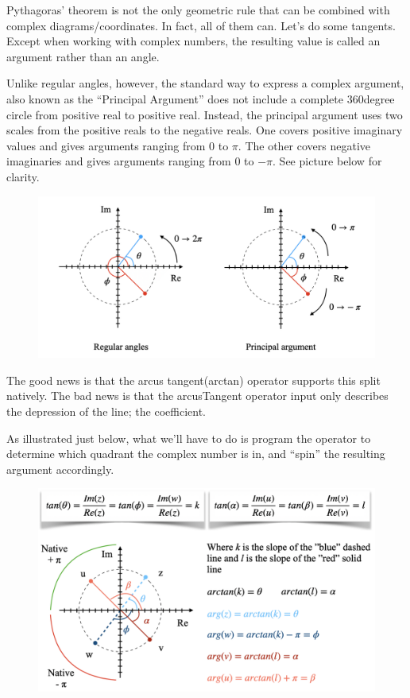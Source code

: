 Pythagoras' theorem is not the only geometric rule that can be combined with complex diagrams/coordinates. In fact, all of them can. Let's do some tangents. Except when working with complex numbers, the resulting value is called an argument rather than an angle.

Unlike regular angles, however, the standard way to express a complex argument, also known as the ``Principal Argument'' does not include a complete 360degree circle from positive real to positive real. Instead, the principal argument uses two scales from the positive reals to the negative reals. One covers positive imaginary values and gives arguments ranging from 0 to $\pi$. The other covers negative imaginaries and gives arguments ranging from 0 to $-\pi$. See picture below for clarity.

\begin{figure}[h!]
    \centering
    \includegraphics[scale= 0.45]{arg.png}
    \caption{}
    \label{arg}
\end{figure}

The good news is that the arcus tangent(arctan) operator supports this split natively. The bad news is that the arcusTangent operator input only describes the depression of the line; the coefficient.

As illustrated just below, what we'll have to do is program the operator to determine which quadrant the complex number is in, and ``spin'' the resulting argument accordingly.

\begin{figure}[h!]
    \centering
    \includegraphics[scale= 0.5]{tan.png}
    \caption{}
    \label{tan}
\end{figure}

